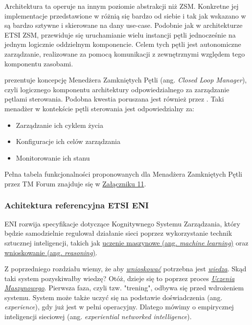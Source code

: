 Architektura ta operuje na innym poziomie abstrakcji niż ZSM. Konkretne jej implementacje przedstawione w \cite{tmforum2022} różnią się bardzo od siebie i tak jak wskazano w \cite{fallon2019} są bardzo sztywne i skierowane na dany use-case. Podobnie jak w architekturze ETSI ZSM, przewiduje się uruchamianie wielu instancji pętli jednocześnie na jednym logicznie oddzielnym komponencie. Celem tych pętli jest autonomiczne zarządzanie, realizowane za pomocą komunikacji z zewnętrznymi względem tego komponentu zasobami.

\cite{tmforum2022ai} prezentuje koncepcję Menedżera Zamkniętych Pętli (ang. \textit{Closed Loop Manager}), czyli logicznego komponentu architektury odpowiedzialnego za zarządzanie pętlami sterowania. Podobna kwestia poruszana jest również przez \cite{ngmn2022}. Taki menadżer w kontekście pętli sterowania jest odpowiedzialny za:
\begin{itemize}
    \item Zarządzanie ich cyklem życia 
    \item Konfiguracje ich celów zarządzania
    \item Monitorowanie ich stanu
\end{itemize}

Pełna tabela funkcjonalności proponowanych dla Menadżera Zamkniętych Pętli przez TM Forum znajduje się w \hyperlink{appendix:11}{Załączniku 11}.

\subsubsection{Achitektura referencyjna ETSI ENI}

ENI rozwija specyfikacje dotyczące Kognitywnego Systemu Zarządzania, który będzie samodzielnie regulował działanie sieci poprzez wykorzystanie technik sztucznej inteligencji, takich jak \hyperlink{def:uczenie-maszynowe}{uczenie maszynowe (ang. \textit{machine learning})} oraz \hyperlink{def:wnioskowanie}{wnioskowanie (ang. \textit{reasoning})}. 

Z poprzedniego rozdziału wiemy, że aby \hyperlink{def:wnioskowanie}{\textit{wnioskować}} potrzebna jest \hyperlink{def:wiedza}{\textit{wiedza}}. Skąd taki system pozyskiwałby wiedzę? Otóż, dzieje się to poprzez proces \hyperlink{def:uczenie-maszynowe}{\textit{Uczenia Maszynowego}}. Pierwsza faza, czyli tzw. "trening", odbywa się przed wdrożeniem systemu. System może także uczyć się na podstawie doświadczenia (ang. \textit{experience}), gdy już jest w pełni operacyjny. Dlatego mówimy o empirycznej inteligencji sieciowej (ang. \textit{experiential networked intelligence}). 


